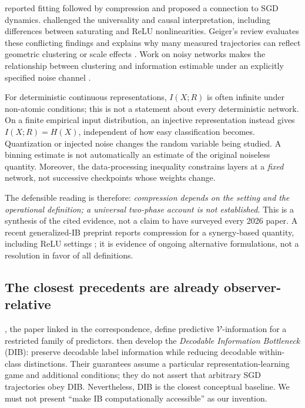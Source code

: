 \documentclass[11pt,a4paper]{article}
\newcommand{\V}{\mathcal V}
\begin{document}
\citet{shwartz2017} reported fitting followed by compression and proposed a connection to SGD dynamics. \citet{saxe2018} challenged the universality and causal interpretation, including differences between saturating and ReLU nonlinearities. Geiger's review evaluates these conflicting findings and explains why many measured trajectories can reflect geometric clustering or scale effects \citep{geiger2021}. Work on noisy networks makes the relationship between clustering and information estimable under an explicitly specified noise channel \citep{goldfeld2019}.

For deterministic continuous representations, $I(X;R)$ is often infinite under non-atomic conditions; this is not a statement about every deterministic network. On a finite empirical input distribution, an injective representation instead gives $I(X;R)=H(X)$, independent of how easy classification becomes. Quantization or injected noise changes the random variable being studied. A binning estimate is not automatically an estimate of the original noiseless quantity. Moreover, the data-processing inequality constrains layers at a \emph{fixed} network, not successive checkpoints whose weights change.

The defensible reading is therefore: \emph{compression depends on the setting and the operational definition; a universal two-phase account is not established}. This is a synthesis of the cited evidence, not a claim to have surveyed every 2026 paper. A recent generalized-IB preprint reports compression for a synergy-based quantity, including ReLU settings \citep{westphal2026}; it is evidence of ongoing alternative formulations, not a resolution in favor of all definitions.

\subsection{The closest precedents are already observer-relative}
\citet{xu2020}, the paper linked in the correspondence, define predictive $\V$-information for a restricted family of predictors. \citet{dubois2020} then develop the \emph{Decodable Information Bottleneck} (DIB): preserve decodable label information while reducing decodable within-class distinctions. Their guarantees assume a particular representation-learning game and additional conditions; they do not assert that arbitrary SGD trajectories obey DIB. Nevertheless, DIB is the closest conceptual baseline. We must not present ``make IB computationally accessible'' as our invention.
\end{document}
